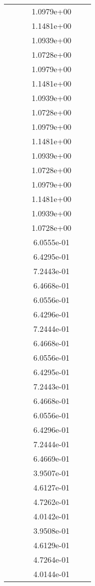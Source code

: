 \begin{xltabular}{\textwidth}{r|rS[table-format=1.3e+2]S[table-format=1.4e+2]S[table-format=1.4e+2]S[table-format=-1.5]}
&  &  & 1.0979e+00 & & \\
&  &  & 1.1481e+00 & & \\
&  &  & 1.0939e+00 & & \\
&  &  & 1.0728e+00 & & \\
&  &  & 1.0979e+00 & & \\
&  &  & 1.1481e+00 & & \\
&  &  & 1.0939e+00 & & \\
&  &  & 1.0728e+00 & & \\
&  &  & 1.0979e+00 & & \\
&  &  & 1.1481e+00 & & \\
&  &  & 1.0939e+00 & & \\
&  &  & 1.0728e+00 & & \\
&  &  & 1.0979e+00 & & \\
&  &  & 1.1481e+00 & & \\
&  &  & 1.0939e+00 & & \\
&  &  & 1.0728e+00 & & \\
&  &  & 6.0555e-01 & & \\
&  &  & 6.4295e-01 & & \\
&  &  & 7.2443e-01 & & \\
&  &  & 6.4668e-01 & & \\
&  &  & 6.0556e-01 & & \\
&  &  & 6.4296e-01 & & \\
&  &  & 7.2444e-01 & & \\
&  &  & 6.4668e-01 & & \\
&  &  & 6.0556e-01 & & \\
&  &  & 6.4295e-01 & & \\
&  &  & 7.2443e-01 & & \\
&  &  & 6.4668e-01 & & \\
&  &  & 6.0556e-01 & & \\
&  &  & 6.4296e-01 & & \\
&  &  & 7.2444e-01 & & \\
&  &  & 6.4669e-01 & & \\
&  &  & 3.9507e-01 & & \\
&  &  & 4.6127e-01 & & \\
&  &  & 4.7262e-01 & & \\
&  &  & 4.0142e-01 & & \\
&  &  & 3.9508e-01 & & \\
&  &  & 4.6129e-01 & & \\
&  &  & 4.7264e-01 & & \\
&  &  & 4.0144e-01 & & \\

\end{xltabular}
